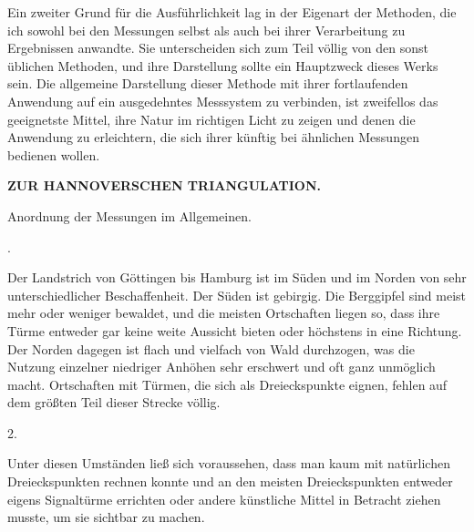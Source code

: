 \par\noindent\hspace*{\parindent}Ein zweiter Grund für die Ausführlichkeit lag in der Eigenart der
Methoden, die ich sowohl bei den Messungen selbst als auch bei ihrer Verarbeitung
zu Ergebnissen anwandte. Sie unterscheiden sich zum Teil völlig von den
sonst üblichen Methoden, und ihre Darstellung sollte ein Hauptzweck dieses
Werks sein. Die allgemeine Darstellung dieser Methode mit ihrer fortlaufenden
Anwendung auf ein ausgedehntes Messsystem zu verbinden, ist zweifellos das
geeignetste Mittel, ihre Natur im richtigen Licht zu zeigen und denen die
Anwendung zu erleichtern, die sich ihrer künftig bei ähnlichen Messungen
bedienen wollen.
\par\clearpage

\noindent\null\hfill{\small\textbf{ZUR HANNOVERSCHEN TRIANGULATION.}}\hfill{}\par\medskip
\begin{center}
\par\smallskip
Anordnung der Messungen im Allgemeinen.\par{}.
\end{center}

\par\noindent\hspace*{\parindent}Der Landstrich von Göttingen bis Hamburg ist im Süden und im Norden
von sehr unterschiedlicher Beschaffenheit. Der Süden ist gebirgig. Die
Berggipfel sind meist mehr oder weniger bewaldet, und die meisten Ortschaften
liegen so, dass ihre Türme entweder gar keine weite Aussicht bieten oder
höchstens in eine Richtung. Der Norden dagegen ist flach und vielfach von
Wald durchzogen, was die Nutzung einzelner niedriger Anhöhen sehr erschwert
und oft ganz unmöglich macht. Ortschaften mit Türmen, die sich als
Dreieckspunkte eignen, fehlen auf dem größten Teil dieser Strecke völlig.

\begin{center}
2.
\end{center}

\par\noindent\hspace*{\parindent}Unter diesen Umständen ließ sich voraussehen, dass man kaum mit
natürlichen Dreieckspunkten rechnen konnte und an den meisten Dreieckspunkten
entweder eigens Signaltürme errichten oder andere künstliche Mittel in Betracht
ziehen musste, um sie sichtbar zu machen.

